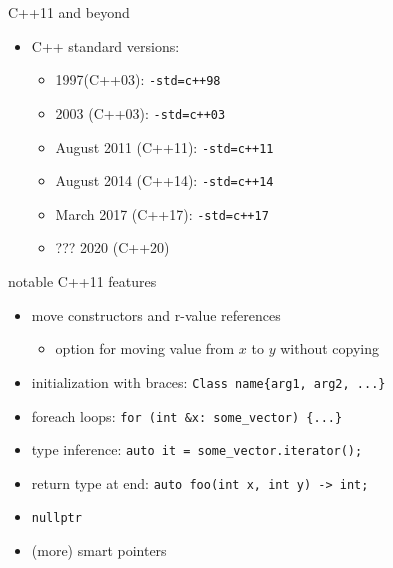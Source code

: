 \begin{frame}{C++11 and beyond}
\begin{itemize}
\item C++ standard versions:
    \begin{itemize}
    \item 1997(C++03): \texttt{-std=c++98}
    \item 2003 (C++03): \texttt{-std=c++03}
    \item August 2011 (C++11): \texttt{-std=c++11}
    \item August 2014 (C++14): \texttt{-std=c++14}
    \item March 2017 (C++17): \texttt{-std=c++17}
    \item ??? 2020 (C++20)
    \end{itemize}
\end{itemize}
\end{frame}

\begin{frame}[fragile,label=notableCpp11]{notable C++11 features}
\lstset{language=C++}
\begin{itemize}
\item move constructors and r-value references
    \begin{itemize}
    \item option for moving value from $x$ to $y$ without copying
    \end{itemize}
\item initialization with braces: \lstinline|Class name{arg1, arg2, ...}|
\item foreach loops: \lstinline|for (int &x: some_vector) {...}|
\item type inference: \lstinline|auto it = some_vector.iterator();|
\item return type at end: \lstinline|auto foo(int x, int y) -> int;|
\item \lstinline|nullptr|
\item (more) smart pointers
\end{itemize}
\end{frame}
